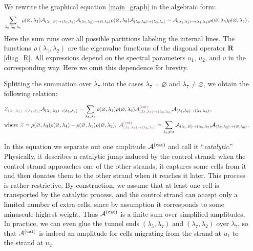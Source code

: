 \documentclass[10pt]{article}
\theoremstyle{definition}
\def\CA{{\cal A}}
\def\lm{\limits}
\numberwithin{equation}{section}
\begin{document}
We rewrite the graphical equation \eqref{main_graph} in the algebraic form:
\begin{equation}
	\sum\lm_{\lambda_5,\lambda_6,\lambda_7}\rho(\varnothing,\lambda_1)\CA_{(\lambda_1,\varnothing)\to(\lambda_5,\lambda_7)}\CA_{(\lambda_7,\lambda_2)\to(\varnothing,\lambda_6)}\rho(\varnothing,\lambda_6)\CA_{(\lambda_5,\lambda_6)\to (\lambda_3,\lambda_4)}=\CA_{(\lambda_1,\lambda_2)\to(\lambda_3,\lambda_4)}\rho(\varnothing,\lambda_3)\rho(\varnothing,\lambda_4)\,.
\end{equation}
Here the sum runs over all possible partitions labeling the internal lines.
The functions $\rho(\lambda_1,\lambda_2)$ are the eigenvalue functions of the diagonal operator $\mathbf{R}$ \eqref{diag_R}.
All expressions depend on the spectral parameters $u_1$, $u_2$, and $v$ in the corresponding way.
Here we omit this dependence for brevity.

Splitting the summation over $\lambda_7$ into the cases $\lambda_7=\varnothing$ and $\lambda_7\neq\varnothing$, we obtain the following relation:
\begin{tcolorbox}
\begin{equation}\label{main_amp}
\begin{aligned}
	&{\color{color7}Z_{(\lambda_1,\lambda_2)\to(\lambda_1,\lambda_2)}}\CA_{(\lambda_1,\lambda_2)\to(\lambda_3,\lambda_4)}=\sum\lm_{\lambda_5,\lambda_6}\rho(\varnothing,\lambda_1)\rho(\varnothing,\lambda_6){\color{color1}\CA^{\rm (cat)}_{(\lambda_1,\lambda_2)\to(\lambda_5,\lambda_6)}}\CA_{(\lambda_5,\lambda_6)\to (\lambda_3,\lambda_4)}\,,\\
	&\mbox{where } {\color{color7}Z}=\rho(\varnothing,\lambda_3)\rho(\varnothing,\lambda_4)-\rho(\varnothing,\lambda_1)\rho(\varnothing,\lambda_2),\;{\color{color1}\CA^{\rm (cat)}_{(\lambda_1,\lambda_2)\to(\lambda_5,\lambda_6)}}=\sum\lm_{\lambda_7\neq \varnothing}\CA_{(\lambda_1,\varnothing)\to(\lambda_5,\lambda_7)}\CA_{(\lambda_7,\lambda_2)\to(\varnothing,\lambda_6)}\,.
\end{aligned}
\end{equation}
\end{tcolorbox}
\noindent In this equation we separate out one amplitude $\CA^{\rm (cat)}$ and call it ``\emph{catalytic}.''
Physically, it describes a catalytic jump induced by the control strand: when the control strand approaches one of the other strands, it captures some cells from it and then donates them to the other strand when it reaches it later.
This process is rather restrictive.
By construction, we assume that at least one cell is transported by the catalytic process, and the control strand can accept only a limited number of extra cells, since by assumption it corresponds to some minuscule highest weight.
Thus $\CA^{\mathrm{(cat)}}$ is a finite sum over simplified amplitudes.
In practice, we can even glue the tunnel ends $(\lambda_5,\lambda_7)$ and $(\lambda_7,\lambda_2)$ over $\lambda_7$, so that $\CA^{\mathrm{(cat)}}$ is indeed an amplitude for cells migrating from the strand at $u_1$ to the strand at $u_2$.
\end{document}
